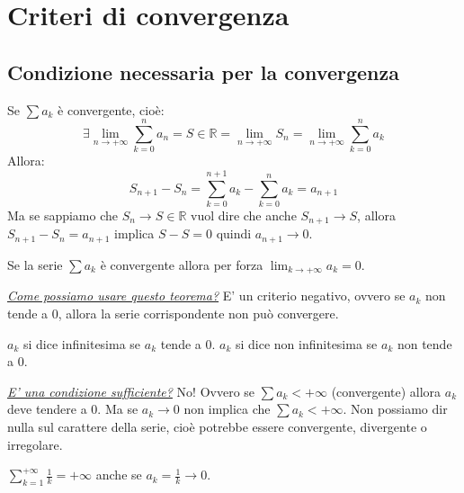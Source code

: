 \section{Criteri di convergenza}
\subsection*{Condizione necessaria per la convergenza}
Se $\sum a_k$ è convergente, cioè: 
\begin{equation*}
    \exists\lim_{n\to+\infty}\sum^n_{k=0}a_n=S\in\mathbb{R}=\lim_{n\to+\infty}S_n=\lim_{n\to+\infty}\sum^n_{k=0}a_k    
\end{equation*}
Allora:
\begin{equation*}
    S_{n+1}-S_n=\sum^{n+1}_{k=0}a_k-\sum^{n}_{k=0}a_k=a_{n+1}
\end{equation*}
Ma se sappiamo che $S_n\to S\in\mathbb{R}$ vuol dire che anche $S_{n+1}\to S$, allora $S_{n+1}-S_n=a_{n+1}$ implica $S-S=0$ quindi $a_{n+1}\to0$.

\begin{thm}\label{thm:convergenza_serie}
    Se la serie $\sum a_k$ è convergente allora per forza $\lim_{k\to+\infty}a_k=0$.
\end{thm}

\underline{\textit{Come possiamo usare questo teorema?}}
E' un criterio negativo, ovvero se $a_k$ non tende a $0$, allora la serie corrispondente non può convergere.

\begin{notation*}
    $a_k$ si dice infinitesima se $a_k$ tende a $0$. $a_k$ si dice non infinitesima se $a_k$ non tende a $0$.
\end{notation*}

\underline{\textit{E' una condizione sufficiente?}}
No! Ovvero se $\sum a_k<+\infty$ (convergente) allora $a_k$ deve tendere a $0$. Ma se $a_k\to0$ non implica che $\sum a_k<+\infty$. Non possiamo dir nulla sul carattere della serie, cioè potrebbe essere convergente, divergente o irregolare.

\begin{example}
    $\sum^{+\infty}_{k=1}\frac{1}{k}=+\infty$ anche se $a_k=\frac{1}{k}\to0$.
\end{example}
